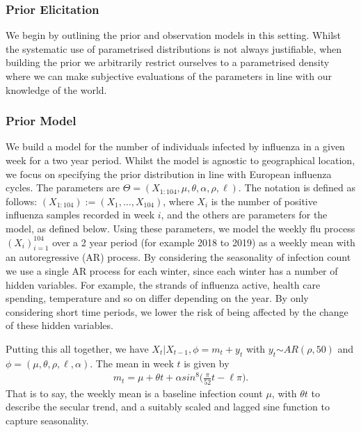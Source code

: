 \documentclass[letterpaper,10pt,english]{sphinxmanual}
\begin{document}
\subsubsection{Prior Elicitation}
\label{\detokenize{models/how_big:prior-elicitation}}
We begin by outlining the prior and observation models in this setting.
Whilst the systematic use of parametrised distributions is not always
justifiable, when building the prior we arbitrarily restrict ourselves
to a parametrised density where we can make subjective evaluations of
the parameters in line with our knowledge of the world.


\subsubsection{Prior Model}
\label{\detokenize{models/how_big:prior-model}}
We build a model for the number of individuals infected by influenza in
a given week for a two year period. Whilst the model is agnostic to
geographical location, we focus on specifying the prior distribution in
line with European influenza cycles. The parameters are
\(\Theta = (X_{1:104},\mu, \theta, \alpha, \rho, \ell)\).
The notation is defined as follows: \((X_{1:104}) := (X_1,\ldots,X_{104})\), where \(X_i\) is the number of positive influenza samples recorded in week \(i\), and the others are parameters for the model, as defined below.
Using these parameters, we model the weekly flu process \((X_i)_{i=1}^{104}\) over a 2 year period (for example 2018 to 2019) as a weekly mean with an
autoregressive (AR) process. By considering the seasonality of infection
count we use a single AR process for each winter, since each winter has a number of hidden variables. For example, the strands of influenza active, health care spending, temperature and so on differ depending on the year. By only considering short time periods, we lower the risk of being affected by the change of these hidden variables.

Putting this all together, we have \(X_t|X_{t-1},\phi = m_t+y_t\) with
\(y_t \stackrel{}{\sim} AR(\rho,50)\) and
\(\phi = (\mu, \theta, \rho, \ell, \alpha)\). The mean in week
\(t\) is given by
\begin{equation*}
\begin{split}m_{t} = \mu + \theta t + \alpha sin^8\Big(\frac{\pi}{52}t - \ell\pi\Big).\end{split}
\end{equation*}
That is to say, the weekly mean is a baseline infection count
\(\mu\), with \(\theta t\) to describe the secular trend, and a
suitably scaled and lagged sine function to capture seasonality.
\end{document}
